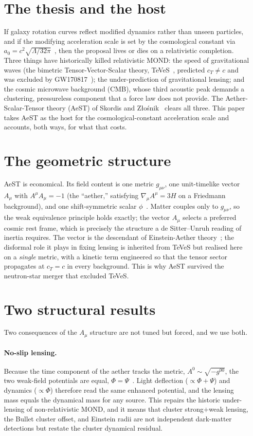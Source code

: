 \documentclass[aps,prd,twocolumn,10pt,nofootinbib,superscriptaddress]{revtex4-2}
\begin{document}
\section{The thesis and the host}
If galaxy rotation curves reflect modified dynamics rather than unseen particles, and if the modifying acceleration
scale is set by the cosmological constant via $a_0=c^2\sqrt{\Lambda/32\pi}$~\cite{Milgrom1983,Skordis2021}, then the
proposal lives or dies on a relativistic completion. Three things have historically killed relativistic MOND: the
speed of gravitational waves (the bimetric Tensor-Vector-Scalar theory, TeVeS~\cite{Bekenstein2004}, predicted
$c_T\neq c$ and was excluded by GW170817~\cite{GW170817}); the under-prediction of gravitational lensing; and the
cosmic microwave background (CMB), whose third acoustic peak demands a clustering, pressureless component that a force
law does not provide. The Aether-Scalar-Tensor theory (AeST) of Skordis and Z\l o\'snik~\cite{Skordis2021} clears all
three. This paper takes AeST as the host for the cosmological-constant acceleration scale and accounts, both ways, for
what that costs.

\section{The geometric structure}
AeST is economical. Its field content is one metric $g_{\mu\nu}$, one unit-timelike vector $A_\mu$ with $A^\mu
A_\mu=-1$ (the ``aether,'' satisfying $\nabla_\mu A^\mu=3H$ on a Friedmann background), and one shift-symmetric scalar
$\phi$~\cite{Skordis2021}. Matter couples only to $g_{\mu\nu}$, so the weak equivalence principle holds exactly; the
vector $A_\mu$ selects a preferred cosmic rest frame, which is precisely the structure a de Sitter--Unruh reading of
inertia requires. The vector is the descendant of Einstein-Aether theory~\cite{Jacobson2001}; the disformal role it
plays in fixing lensing is inherited from TeVeS but realised here on a \emph{single} metric, with a kinetic term
engineered so that the tensor sector propagates at $c_T=c$ in every background. This is why AeST survived the
neutron-star merger that excluded TeVeS.

\section{Two structural results}
Two consequences of the $A_\mu$ structure are not tuned but forced, and we use both.

\paragraph{No-slip lensing.} Because the time component of the aether tracks the metric, $A^0\sim\sqrt{-g^{00}}$, the
two weak-field potentials are equal, $\Phi=\Psi$~\cite{Verwayen2024}. Light deflection ($\propto\Phi+\Psi$) and
dynamics ($\propto\Phi$) therefore read the same enhanced potential, and the lensing mass equals the dynamical mass
for any source. This repairs the historic under-lensing of non-relativistic MOND, and it means that cluster
strong$+$weak lensing, the Bullet cluster offset, and Einstein radii are not independent dark-matter detections but
restate the cluster dynamical residual.
\end{document}

